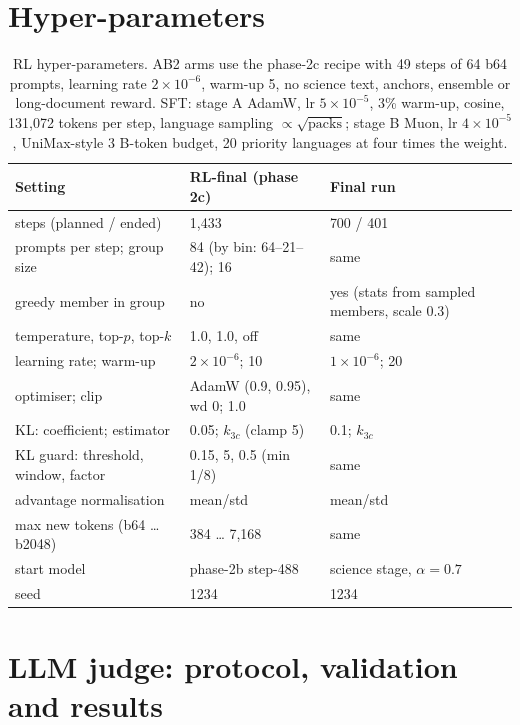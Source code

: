 \section{Hyper-parameters}\label{app:hparams}
\begin{table}[h]
\centering\small\setlength{\tabcolsep}{6pt}
\begin{tabular}{@{}lll@{}}
\toprule
Setting & RL-final (phase 2c) & Final run \\
\midrule
steps (planned / ended) & 1,433 & 700 / 401 \\
prompts per step; group size & 84 (by bin: 64--21--42); 16 & same \\
greedy member in group & no & yes (stats from sampled members, scale 0.3) \\
temperature, top-$p$, top-$k$ & 1.0, 1.0, off & same \\
learning rate; warm-up & $2\times10^{-6}$; 10 & $1\times10^{-6}$; 20 \\
optimiser; clip & AdamW (0.9, 0.95), wd 0; 1.0 & same \\
KL: coefficient; estimator & 0.05; $k_{3c}$ (clamp 5) & 0.1; $k_{3c}$ \\
KL guard: threshold, window, factor & 0.15, 5, 0.5 (min 1/8) & same \\
advantage normalisation & mean/std & mean/std \\
max new tokens (b64 \ldots{} b2048) & 384 \ldots{} 7,168 & same \\
start model & phase-2b step-488 & science stage, $\alpha=0.7$ \\
seed & 1234 & 1234 \\
\bottomrule
\end{tabular}
\caption{RL hyper-parameters. AB2 arms use the phase-2c recipe with 49 steps of 64 b64 prompts, learning rate $2\times10^{-6}$, warm-up 5, no science text, anchors, ensemble or long-document reward. SFT: stage A AdamW, lr $5\times10^{-5}$, 3\% warm-up, cosine, 131,072 tokens per step, language sampling $\propto\sqrt{\text{packs}}$; stage B Muon, lr $4\times10^{-5}$, UniMax-style 3 B-token budget, 20 priority languages at four times the weight.}
\label{tab:hp}
\end{table}

\section{LLM judge: protocol, validation and results}\label{app:judge}
